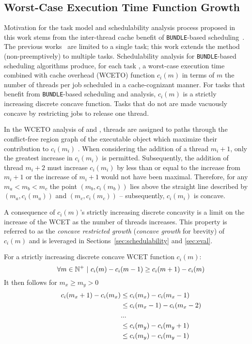 \subsection{Worst-Case Execution Time Function Growth}
\label{sec:discrete-growth}

Motivation for the task model and schedulability analysis process
proposed in this work stems from the inter-thread cache benefit of
\texttt{BUNDLE}-based scheduling~\cite{Tessler:2016,
  Tessler:2018}. The previous works~\cite{Tessler:2016, Tessler:2018}
are limited to a single task; this work extends the method
(non-preemptively) to multiple tasks. Schedulability analysis for
\texttt{BUNDLE}-based scheduling algorithms produce, for each task
, a worst-case execution time combined with cache overhead
(WCETO) function ${c_i(m)}$ in terms of ${m}$ the number of threads
per job scheduled in a cache-cognizant manner. For tasks that benefit
from \texttt{BUNDLE}-based scheduling and analysis, ${c_i(m)}$ is a
strictly increasing discrete concave function. Tasks that do not are
made vacuously concave by restricting jobs to release one thread.

In the WCETO analysis of \bundle{} and \bundlep{}, threads are
assigned to paths through the conflict-free region graph of the
executable object which maximize their contribution to
${c_i(m_i)}$ . When considering the addition of a thread ${m_i + 1}$,
only the greatest increase in ${c_i(m_i)}$ is permitted. Subsequently,
the addition of thread ${m_i + 2}$ must increase ${c_i(m_i)}$ by less
than or equal to the increase from ${m_i + 1}$ or the increase of
${m_i + 1}$ would not have been maximal. Therefore, for any ${m_a <
  m_b < m_c}$ the point ${(m_b, c_i(m_b))}$ lies above the straight line
described by ${(m_a, c_i(m_a))}$ and ${(m_c, c_i(m_c))}$ --
subsequently, ${c_i(m_i)}$ is concave.

A consequence of ${c_i(m)}$'s strictly increasing discrete
concavity is a limit on the increase of the WCET as the number of
threads increases. This property is referred to as the
\emph{concave restricted growth} (\emph{concave growth} for brevity) of
${c_i(m)}$ and is leveraged in Sections~\ref{sec:schedulability} and
\ref{sec:eval}. 

\begin{prop}
  \label{prop:ni-growth}
  For a strictly increasing discrete
  concave WCET function ${c_i(m)}$:
  \label{prop:wcet-growth}
  \begin{equation}
    \label{eq:wcet-growth}
    \indent
    \forall m \in \mathbb{N}^+~|~c_i(m) - c_i(m - 1) \ge c_i(m + 1) - c_i(m)
  \end{equation}
  It then follows for ${m_x \ge m_y > 0}$
  \begin{align*}
    \indent
    c_i(m_x + 1) - c_i(m_x) &\le c_i(m_x) - c_i(m_x - 1) \\
    &\le c_i(m_x - 1) - c_i(m_x - 2) \\
    &... \\
    &\le c_i(m_y) - c_i(m_y + 1) \\
    &\le c_i(m_y) - c_i(m_y - 1)
  \end{align*}
\end{prop}



